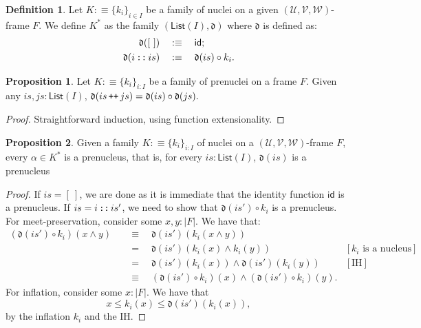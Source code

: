 \documentclass[a4paper, 11pt]{article}
\theoremstyle{definition}
\newtheorem{prop}{Proposition}
\newtheorem{defn}{Definition}
\DeclareMathOperator{\cons}{\text{\texttt{::}}}
\DeclareMathOperator{\append}{\text{\texttt{++}}}
\newcommand{\UU}{\mathcal{U}}
\newcommand{\VV}{\mathcal{V}}
\newcommand{\WW}{\mathcal{W}}
\begin{document}
\begin{defn}
  Let $K :\equiv \{ k_i \}_{i \in I}$ be a family of nuclei on a given $(\UU, \VV, \WW)$-frame $F$. We
  define $K^*$ as the family $(\mathsf{List}(I), \mathfrak{d})$ where $\mathfrak{d}$ is defined as:
  \begin{align*}
    \mathfrak{d}(\mathtt{[\ ]})  \quad&:\equiv\quad \mathsf{id}; \\
    \mathfrak{d}(i \cons is)     \quad&:\equiv\quad \mathfrak{d}(is) \circ k_i.
  \end{align*}
\end{defn}

\begin{prop}\label{prop:app-lemma}
  Let $K :\equiv \{ k_i \}_{i : I}$ be a family of prenuclei on a frame $F$. Given
  any $is, js : \mathsf{List}(I)$,
  \(
    \mathfrak{d}(is \append js) = \mathfrak{d}(is) \circ \mathfrak{d}(js).
  \)
\end{prop}
\begin{proof}
  Straightforward induction, using function extensionality.
\end{proof}

\begin{prop}\label{prop:star-prenucleus}
  Given a family $K :\equiv \{ k_i \}_{i : I}$ of nuclei on a $(\UU, \VV, \WW)$-frame
  $F$, every $\alpha \in K^*$ is a prenucleus, that is, for every
  $is : \mathsf{List}(I)$, $\mathfrak{d}(is)$ is a prenucleus
\end{prop}
\begin{proof}
  If $is = \mathtt{[\ ]}$, we are done as it is immediate that the identity
  function $\mathsf{id}$ is a prenucleus. If $is = i \cons is'$, we need
  to show that $\mathfrak{d}(is') \circ k_i$ is a prenucleus. For meet-preservation,
  consider some $x, y : | F |$. We have that:
  \begin{align*}
    (\mathfrak{d}(is') \circ k_i)(x \wedge y)
      &\quad\equiv\quad \mathfrak{d}(is')(k_i(x \wedge y))\\
      &\quad=\quad \mathfrak{d}(is')(k_i(x) \wedge k_i(y)) & [\text{$k_i$ is a nucleus}]\\
      &\quad=\quad \mathfrak{d}(is')(k_i(x)) \wedge \mathfrak{d}(is')(k_i(y)) & [\text{IH}]\\
      &\quad\equiv\quad (\mathfrak{d}(is') \circ k_i)(x) \wedge (\mathfrak{d}(is') \circ k_i)(y).
  \end{align*}
  For inflation, consider some $x : | F |$. We have that
  \begin{equation*}
    x \le k_i(x) \le \mathfrak{d}(is')(k_i(x)),
  \end{equation*}
  by the inflation $k_i$ and the IH.
\end{proof}
\end{document}
